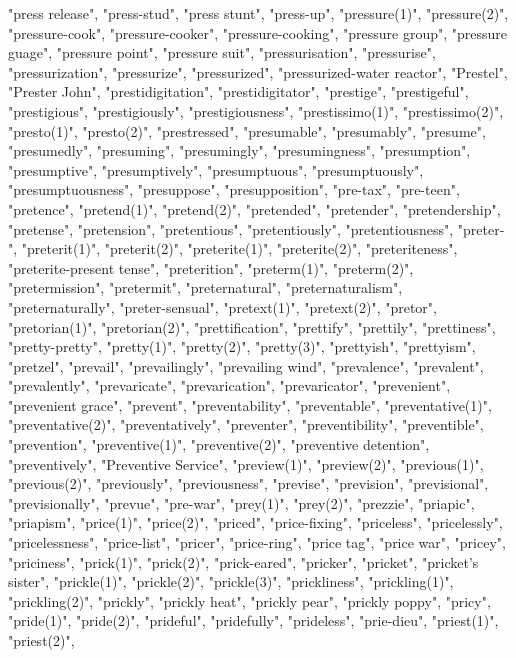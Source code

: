 "press release",
"press-stud",
"press stunt",
"press-up",
"pressure(1)",
"pressure(2)",
"pressure-cook",
"pressure-cooker",
"pressure-cooking",
"pressure group",
"pressure guage",
"pressure point",
"pressure suit",
"pressurisation",
"pressurise",
"pressurization",
"pressurize",
"pressurized",
"pressurized-water reactor",
"Prestel",
"Prester John",
"prestidigitation",
"prestidigitator",
"prestige",
"prestigeful",
"prestigious",
"prestigiously",
"prestigiousness",
"prestissimo(1)",
"prestissimo(2)",
"presto(1)",
"presto(2)",
"prestressed",
"presumable",
"presumably",
"presume",
"presumedly",
"presuming",
"presumingly",
"presumingness",
"presumption",
"presumptive",
"presumptively",
"presumptuous",
"presumptuously",
"presumptuousness",
"presuppose",
"presupposition",
"pre-tax",
"pre-teen",
"pretence",
"pretend(1)",
"pretend(2)",
"pretended",
"pretender",
"pretendership",
"pretense",
"pretension",
"pretentious",
"pretentiously",
"pretentiousness",
"preter-",
"preterit(1)",
"preterit(2)",
"preterite(1)",
"preterite(2)",
"preteriteness",
"preterite-present tense",
"preterition",
"preterm(1)",
"preterm(2)",
"pretermission",
"pretermit",
"preternatural",
"preternaturalism",
"preternaturally",
"preter-sensual",
"pretext(1)",
"pretext(2)",
"pretor",
"pretorian(1)",
"pretorian(2)",
"prettification",
"prettify",
"prettily",
"prettiness",
"pretty-pretty",
"pretty(1)",
"pretty(2)",
"pretty(3)",
"prettyish",
"prettyism",
"pretzel",
"prevail",
"prevailingly",
"prevailing wind",
"prevalence",
"prevalent",
"prevalently",
"prevaricate",
"prevarication",
"prevaricator",
"prevenient",
"prevenient grace",
"prevent",
"preventability",
"preventable",
"preventative(1)",
"preventative(2)",
"preventatively",
"preventer",
"preventibility",
"preventible",
"prevention",
"preventive(1)",
"preventive(2)",
"preventive detention",
"preventively",
"Preventive Service",
"preview(1)",
"preview(2)",
"previous(1)",
"previous(2)",
"previously",
"previousness",
"previse",
"prevision",
"previsional",
"previsionally",
"prevue",
"pre-war",
"prey(1)",
"prey(2)",
"prezzie",
"priapic",
"priapism",
"price(1)",
"price(2)",
"priced",
"price-fixing",
"priceless",
"pricelessly",
"pricelessness",
"price-list",
"pricer",
"price-ring",
"price tag",
"price war",
"pricey",
"priciness",
"prick(1)",
"prick(2)",
"prick-eared",
"pricker",
"pricket",
"pricket's sister",
"prickle(1)",
"prickle(2)",
"prickle(3)",
"prickliness",
"prickling(1)",
"prickling(2)",
"prickly",
"prickly heat",
"prickly pear",
"prickly poppy",
"pricy",
"pride(1)",
"pride(2)",
"prideful",
"pridefully",
"prideless",
"prie-dieu",
"priest(1)",
"priest(2)",
